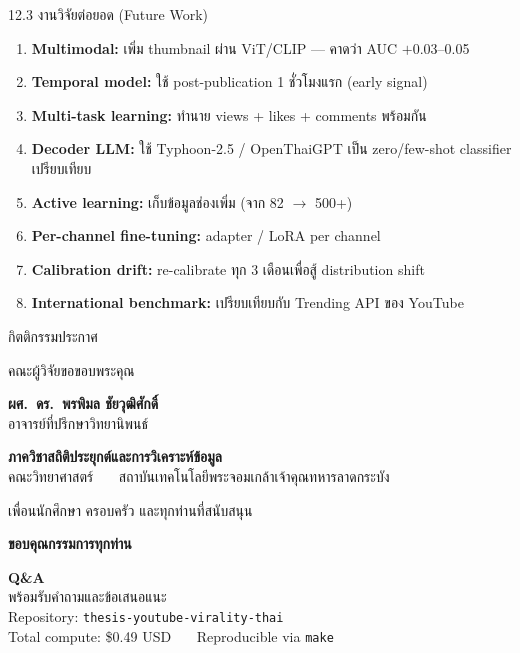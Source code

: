 \documentclass[aspectratio=169,11pt,xcolor=dvipsnames]{beamer}
\newcommand{\hl}[1]{\textcolor{kmitlOrange}{\textbf{#1}}}
\newcommand{\hlb}[1]{\textcolor{kmitlBlue}{\textbf{#1}}}
\begin{document}
\begin{frame}{12.3 งานวิจัยต่อยอด (Future Work)}
  \begin{enumerate}\setlength\itemsep{0.3em}
    \item \hlb{Multimodal:} เพิ่ม thumbnail ผ่าน ViT/CLIP — คาดว่า AUC $+$0.03--0.05
    \item \hlb{Temporal model:} ใช้ post-publication 1 ชั่วโมงแรก (early signal)
    \item \hlb{Multi-task learning:} ทำนาย views + likes + comments พร้อมกัน
    \item \hlb{Decoder LLM:} ใช้ Typhoon-2.5 / OpenThaiGPT เป็น zero/few-shot classifier เปรียบเทียบ
    \item \hlb{Active learning:} เก็บข้อมูลช่องเพิ่ม (จาก 82 $\rightarrow$ 500+)
    \item \hlb{Per-channel fine-tuning:} adapter / LoRA per channel
    \item \hlb{Calibration drift:} re-calibrate ทุก 3 เดือนเพื่อสู้ distribution shift
    \item \hlb{International benchmark:} เปรียบเทียบกับ Trending API ของ YouTube
  \end{enumerate}
\end{frame}

\begin{frame}{กิตติกรรมประกาศ}
  \begin{center}
    \large
    คณะผู้วิจัยขอขอบพระคุณ
    \vspace{0.6em}

    \hl{ผศ.\ ดร.\ พรพิมล ชัยวุฒิศักดิ์}\\
    อาจารย์ที่ปรึกษาวิทยานิพนธ์
    \vspace{0.6em}

    \hlb{ภาควิชาสถิติประยุกต์และการวิเคราะห์ข้อมูล}\\
    คณะวิทยาศาสตร์ \ \textbullet\ \ สถาบันเทคโนโลยีพระจอมเกล้าเจ้าคุณทหารลาดกระบัง
    \vspace{0.6em}

    เพื่อนนักศึกษา ครอบครัว และทุกท่านที่สนับสนุน
    \vspace{1.0em}

    \LARGE \hl{ขอบคุณกรรมการทุกท่าน}
  \end{center}
\end{frame}

\begin{frame}[plain]
  \vfill
  \begin{center}
    \Huge \hl{Q\&A}\\[1.5em]
    \large พร้อมรับคำถามและข้อเสนอแนะ\\[2em]
    \normalsize
    Repository: \texttt{thesis-youtube-virality-thai}\\
    Total compute: \$0.49 USD \ \textbullet\ \ Reproducible via \texttt{make}
  \end{center}
  \vfill
\end{frame}
\end{document}
